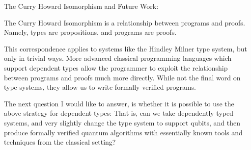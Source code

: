 \documentclass{article}
\theoremstyle{plain}
\theoremstyle{definition}
\theoremstyle{remark}
\begin{document}
$$$$
$$$$
{
\large The Curry Howard Isomorphism and Future Work:}
$$$$
$$$$

The Curry Howard Isomorphism is a relationship between programs and proofs.
Namely, types are propositions, and programs are proofs.

This correspondence applies to systems like the Hindley Milner type system, but only in trivial ways.
More advanced classical programming languages which support dependent types allow the programmer to exploit the relationship between programs and proofs much more directly. While not the final word on type systems, they allow us to write formally verified programs.

$$$$
The next question I would like to answer, is whether it is possible to use the above strategy for dependent types:
That is, can we take dependently typed systems, and very slightly change the type system to support qubits, and then
produce formally verified quantum algorithms with essentially known tools and techniques from the classical setting?
\end{document}
